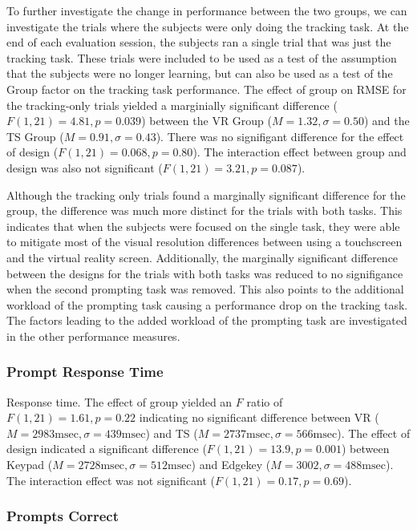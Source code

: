 To further investigate the change in performance between the two groups, we can investigate the trials where the subjects were only doing the tracking task.
At the end of each evaluation session, the subjects ran a single trial that was just the tracking task.
These trials were included to be used as a test of the assumption that the subjects were no longer learning, but can also be used as a test of the Group factor on the tracking task performance.
The effect of group on RMSE for the tracking-only trials yielded a marginially significant difference ($F(1, 21) = 4.81, p = 0.039$) between the VR Group ($M=1.32, \sigma=0.50$) and the TS Group ($M=0.91, \sigma=0.43$).
There was no signifigant difference for the effect of design ($F(1,21) = 0.068, p=0.80$).
The interaction effect between group and design was also not significant ($F(1,21) = 3.21, p=0.087$).

Although the tracking only trials found a marginally significant difference for the group, the difference was much more distinct for the trials with both tasks.
This indicates that when the subjects were focused on the single task, they were able to mitigate most of the visual resolution differences between using a touchscreen and the virtual reality screen.
Additionally, the marginally significant difference between the designs for the trials with both tasks was reduced to no signifigance when the second prompting task was removed.
This also points to the additional workload of the prompting task causing a performance drop on the tracking task.
The factors leading to the added workload of the prompting task are investigated in the other performance measures.

\subsubsection{Prompt Response Time}

Response time.
The effect of group yielded an $F$ ratio of $F(1, 21) = 1.61, p = 0.22$ indicating no significant difference between VR ($M = 2983\mathrm{msec}, \sigma = 439\mathrm{msec}$) and TS ($M = 2737\mathrm{msec}, \sigma = 566\mathrm{msec}$).
The effect of design indicated a significant difference ($F(1, 21) = 13.9, p = 0.001$) between Keypad ($M=2728\mathrm{msec}, \sigma=512\mathrm{msec}$) and Edgekey ($M=3002, \sigma=488\mathrm{msec}$).
The interaction effect was not significant ($F(1, 21) = 0.17, p = 0.69$).

\subsubsection{Prompts Correct}

